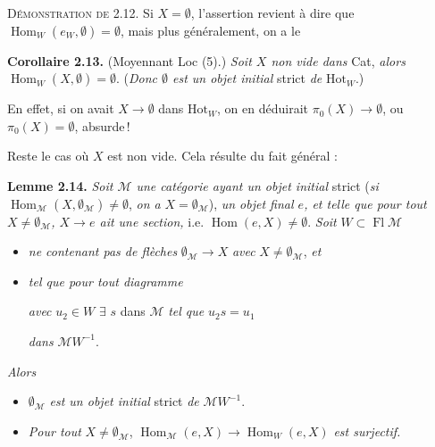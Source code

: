 \documentclass[11pt]{article}
\newcommand{\msp}[1]{\marginpar{\footnotesize [#1]}}
\newcommand{\Hom}{\operatorname{Hom}}
\newcommand{\Fl}{\operatorname{Fl}}
\newcommand{\Hot}{\mathrm{Hot}}
\begin{document}
\textsc{Démonstration de} 2.12. Si $X=\emptyset$, l'assertion revient à dire que $\Hom_W(e_W,\emptyset)=\emptyset$, mais plus généralement, on a le

\textbf{Corollaire 2.13.} (Moyennant Loc (5).) \textit{Soit $X$ non vide dans} Cat, \textit{alors} $\Hom_W(X,\emptyset)=\emptyset$. (\textit{Donc $\emptyset$ est un objet initial} strict \textit{de} $\Hot_W$.)

En effet, si on avait $X\longrightarrow\emptyset$ dans $\Hot_W$,
\msp{page 13'}
on en déduirait $\pi_0(X)\longrightarrow\emptyset$, ou $\pi_0(X)=\emptyset$, absurde\,!

Reste le cas où $X$ est non vide. Cela résulte du fait général :

\textbf{Lemme 2.14.} \textit{Soit $\mathcal{M}$ une catégorie ayant un objet initial} strict (\textit{si} $\Hom_{\mathcal{M}}(X,\emptyset_{\mathcal{M}})\neq\emptyset$, \textit{on a} $X=\emptyset_{\mathcal{M}}$), \textit{un objet final $e$, et telle que pour tout $X\neq\emptyset_{\mathcal{M}}$, $X\longrightarrow e$ ait une section,} i.e. $\Hom(e,X)\neq\emptyset$. \textit{Soit} $W\subset\Fl\mathcal{M}$
\begin{itemize}[leftmargin=3em,labelwidth=2.5em,align=right]
\item[1$^{\circ}$)] \textit{ne contenant pas de flèches} $\emptyset_{\mathcal{M}}\longrightarrow X$ \textit{avec} $X\neq\emptyset_{\mathcal{M}}$, \textit{et}
\item[2\,$^{\circ}$)] \textit{tel que pour tout diagramme}
\textit{avec} $u_2\in W$ $\exists$ $s$ dans $\mathcal{M}$ \textit{tel que} $u_2s=u_1$

\textit{dans} $\mathcal{M}W^{-1}$.
\end{itemize}
\textit{Alors}
\begin{itemize}[leftmargin=3em,labelwidth=2.5em,align=right]
\item[a)] $\emptyset_{\mathcal{M}}$ \textit{est un objet initial} strict \textit{de} $\mathcal{M}W^{-1}$.
\item[b)] \textit{Pour tout} $X\neq\emptyset_{\mathcal{M}}$, $\Hom_{\mathcal{M}}(e,X)\longrightarrow\Hom_W(e,X)$ \textit{est surjectif.}
\end{itemize}
\end{document}
